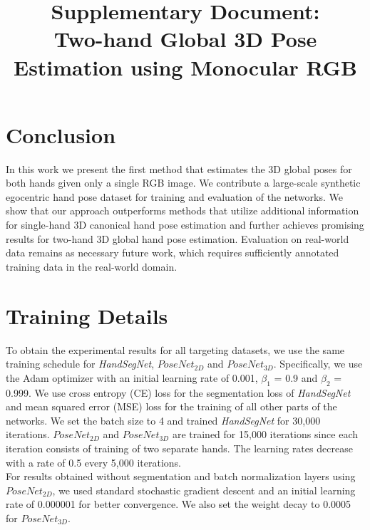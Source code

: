\documentclass[10pt,twocolumn,letterpaper]{article}
\begin{document}
\section{Conclusion}
\indent In this work we present the first method that estimates the 3D global poses for both hands given only a single RGB image. We contribute a large-scale synthetic egocentric hand pose dataset for training and evaluation of the networks. We show that our approach outperforms methods that utilize additional information for single-hand 3D canonical hand pose estimation and further achieves promising results for two-hand 3D global hand pose estimation. Evaluation on real-world data remains as necessary future work, which requires sufficiently annotated training data in the real-world domain. 


\nocite{Liu}
{\small


}

\clearpage
\onecolumn
\title{\vspace{-2.0cm}Supplementary Document:\\
Two-hand Global 3D Pose Estimation using Monocular RGB
}

\author{}
\date{}
\maketitle
\vspace{-3.0cm}
\setcounter{section}{0}
\section{Training Details}
\indent To obtain the experimental results for all targeting datasets, we use the same training schedule for \textit{HandSegNet}, \textit{$PoseNet_{2D}$} and \textit{$PoseNet_{3D}$}. Specifically, we use the Adam optimizer with an initial learning rate of 0.001, $\beta_{1}$ = 0.9 and $\beta_{2}$ = 0.999. We use cross entropy (CE) loss for the segmentation loss of \textit{HandSegNet} and mean squared error (MSE) loss for the training of all other parts of the networks. We set the batch size to 4 and  trained \textit{HandSegNet} for 30,000 iterations. \textit{$PoseNet_{2D}$} and \textit{$PoseNet_{3D}$} are trained for 15,000 iterations since each iteration consists of training of two separate hands. The learning rates decrease with a rate of 0.5 every 5,000 iterations.\\
\indent For results obtained without segmentation and batch normalization layers using \textit{$PoseNet_{2D}$}, we used standard stochastic gradient descent and an initial learning rate of 0.000001 for better convergence. We also set the weight decay to 0.0005 for $PoseNet_{3D}$.
\end{document}
